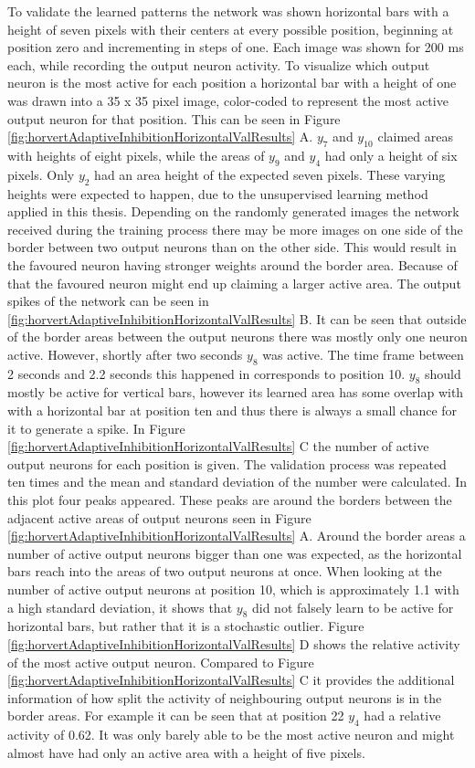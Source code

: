 To validate the learned patterns the network was shown horizontal bars with a height of seven pixels with their centers at every possible position, beginning at position zero and incrementing in steps of one. Each image was shown for 200 ms each, while recording the output neuron activity. To visualize which output neuron is the most active for each position a horizontal bar with a height of one was drawn into a 35 x 35 pixel image, color-coded to represent the most active output neuron for that position. This can be seen in Figure \ref{fig:horvertAdaptiveInhibitionHorizontalValResults} A. $y_7$ and $y_{10}$ claimed areas with heights of eight pixels, while the areas of $y_9$ and $y_4$ had only a height of six pixels. Only $y_2$ had an area height of the expected seven pixels. These varying heights were expected to happen, due to the unsupervised learning method applied in this thesis. Depending on the randomly generated images the network received during the training process there may be more images on one side of the border between two output neurons than on the other side. This would result in the favoured neuron having stronger weights around the border area. Because of that the favoured neuron might end up claiming a larger active area.
The output spikes of the network can be seen in \ref{fig:horvertAdaptiveInhibitionHorizontalValResults} B. It can be seen that outside of the border areas between the output neurons there was mostly only one neuron active. However, shortly after two seconds $y_8$ was active. The time frame between 2 seconds and 2.2 seconds this happened in corresponds to position 10. $y_8$ should mostly be active for vertical bars, however its learned area has some overlap with with a horizontal bar at position ten and thus there is always a small chance for it to generate a spike. 
In Figure \ref{fig:horvertAdaptiveInhibitionHorizontalValResults} C the number of active output neurons for each position is given.  The validation process was repeated ten times and the mean and standard deviation of the number were calculated. In this plot four peaks appeared. These peaks are around the borders between the adjacent active areas of output neurons seen in Figure \ref{fig:horvertAdaptiveInhibitionHorizontalValResults} A. Around the border areas a number of active output neurons bigger than one was expected, as the horizontal bars reach into the areas of two output neurons at once. When looking at the number of active output neurons at position 10, which is approximately 1.1 with a high standard deviation, it shows that $y_8$ did not falsely learn to be active for horizontal bars, but rather that it is a stochastic outlier. Figure \ref{fig:horvertAdaptiveInhibitionHorizontalValResults} D shows the relative activity of the most active output neuron. Compared to Figure \ref{fig:horvertAdaptiveInhibitionHorizontalValResults} C it provides the additional information of how split the activity of neighbouring output neurons is in the border areas. For example it can be seen that at position 22 $y_4$ had a relative activity of 0.62. It was only barely able to be the most active neuron and might almost have had only an active area with a height of five pixels.

